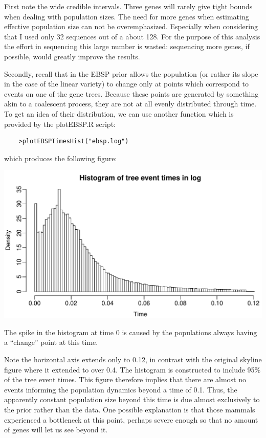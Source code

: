 \documentclass[a4paper,11pt]{article}
\begin{document}
First note the wide credible intervals. Three genes will rarely give tight
bounds when dealing with population sizes. The need for more genes when
estimating effective population size can not be overemphasized. Especially when
considering that I used only 32 sequences out of a about 128. For the purpose
of this analysis the effort in sequencing this large number is wasted:
sequencing more genes, if possible, would greatly improve the results.

Secondly, recall that in the EBSP prior allows the population (or rather its
slope in the case of the linear variety) to change only at points which
correspond to events on one of the gene trees.  Because these points are
generated by something akin to a coalescent process, they are not at all evenly
distributed through time.  To get an idea of their distribution, we can use
another function which is provided by the plotEBSP.R script:
\begin{verbatim}
    >plotEBSPTimesHist("ebsp.log")
\end{verbatim}
which produces the following figure:

\includegraphics[width=\textwidth]{figures/mysteryTimesHist.pdf}

The spike in the histogram at time 0 is caused by the populations always having
a ``change'' point at this time.

Note the horizontal axis extends only to 0.12, in contrast with the original
skyline figure where it extended to over 0.4.  The histogram is constructed to
include 95\% of the tree event times. This figure therefore implies that there
are almost no events informing the population dynamics beyond a time of 0.1.
Thus, the apparently constant population size beyond this time is due almost
exclusively to the prior rather than the data.  One possible explanation is
that those mammals experienced a bottleneck at this point, perhaps severe
enough so that no amount of genes will let us see beyond it.
\end{document}
